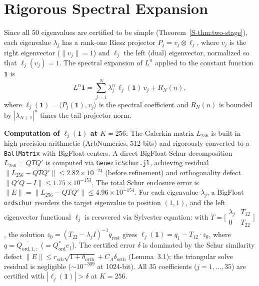 \documentclass[11pt]{article}
\begin{document}
\clearpage
\section*{Rigorous Spectral Expansion}

Since all $50$ eigenvalues are certified to be simple (Theorem~\ref{S-thm:two-stage}),
each eigenvalue $\lambda_j$ has a rank-one Riesz projector
$P_j = v_j \otimes \ell_j$,
where $v_j$ is the right eigenvector ($\|v_j\| = 1$) and $\ell_j$ the left (dual) eigenvector,
normalized so that $\ell_j(v_j) = 1$.
The spectral expansion of $L^n$ applied to the constant function $\mathbf{1}$ is
\begin{equation}
\label{S-eq:spectral-expansion}
L^n \mathbf{1} = \sum_{j=1}^{N} \lambda_j^n \, \ell_j(\mathbf{1}) \, v_j + R_N(n),
\end{equation}
where $\ell_j(\mathbf{1}) = \langle P_j(\mathbf{1}), v_j \rangle$ is the spectral coefficient
and $R_N(n)$ is bounded by $|\lambda_{N+1}|^n$ times the tail projector norm.

\medskip\noindent
\textbf{Computation of $\ell_j(\mathbf{1})$ at $K = 256$.}
The Galerkin matrix $L_{256}$ is built in high-precision arithmetic (ArbNumerics, 512 bits)
and rigorously converted to a \texttt{BallMatrix} with BigFloat centers.
A direct BigFloat Schur decomposition $L_{256} = Q T Q'$ is computed via
\texttt{GenericSchur.jl}, achieving residual $\|L_{256} - QTQ'\| \leq 2.82 \times 10^{-24}$
(before refinement) and orthogonality defect $\|Q'Q - I\| \leq 1.75 \times 10^{-153}$.
The total Schur enclosure error is
$\|E\| = \|L_{256} - QTQ'\| \leq 4.96 \times 10^{-154}$.
For each eigenvalue $\lambda_j$, a BigFloat \texttt{ordschur} reorders the target eigenvalue
to position $(1,1)$, and the left eigenvector functional $\ell_j$ is recovered
via Sylvester equation: with $T = \bigl[\begin{smallmatrix} \lambda_j & T_{12} \\ 0 & T_{22}\end{smallmatrix}\bigr]$,
the solution $z_0 = (T_{22} - \lambda_j I)^{-1} q_{\mathrm{rest}}$ gives
$\ell_j(\mathbf{1}) = q_1 - T_{12} \cdot z_0$,
where $q = \overline{Q_{\mathrm{ord},1,:}}$ ($= Q_{\mathrm{ord}}^* e_1$).
The certified error $\delta$ is dominated by the Schur similarity defect
$\|E\| \leq r_{\mathrm{sch}}\sqrt{1+\delta_{\mathrm{orth}}} + C_A \delta_{\mathrm{orth}}$
(Lemma~3.1); the triangular solve
residual is negligible ($\sim 10^{-309}$ at 1024-bit).
All $35$ coefficients ($j = 1, \ldots, 35$) are certified with $|\ell_j(\mathbf{1})| > \delta$
at $K = 256$.
\end{document}
